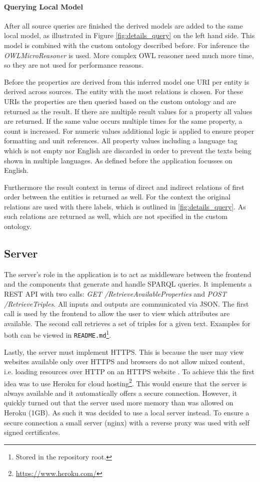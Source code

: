 \paragraph{Querying Local Model}
After all source queries are finished the derived models are added to the same local model, as illustrated in Figure \ref{fig:details_query} on the left hand side. This model is combined with the custom ontology described before. For inference the \textit{OWLMicroReasoner} is used. More complex OWL reasoner need much more time, so they are not used for performance reasons. 

Before the properties are derived from this inferred model one URI per entity is derived across sources. The entity with the most relations is chosen. 
For these URIs the properties are then queried based on the custom ontology and are returned as the result. If there are multiple result values for a property all values are returned. If the same value occurs multiple times for the same property, a count is increased. For numeric values additional logic is applied to ensure proper formatting and unit references. All property values including a language tag which is not empty nor English are discarded in order to prevent the texts being shown in multiple languages. As defined before the application focusses on English. 

Furthermore the result context in terms of direct and indirect relations of first order between the entities is returned as well. For the context the original relations are used with there labels, which is outlined in \ref{fig:details_query}. As such relations are returned as well, which are not specified in the custom ontology. 

\subsection{Server} 
\label{sec:server}
The server's role in the application is to act as middleware between the frontend and the components that generate and handle SPARQL queries. It implements a REST API with two calls: \textit{GET /RetrieveAvailableProperties} and \textit{POST /RetrieveTriples}. All inputs and outputs are communicated via JSON. The first call is used by the frontend to allow the user to view which attributes are available. The second call retrieves a set of triples for a given text. Examples for both can be viewed in \texttt{README.md}\footnote{Stored in the repository root.}. 

Lastly, the server must implement HTTPS. This is because the user may view websites available only over HTTPS and browsers do not allow mixed content, i.e. loading resources over HTTP on an HTTPS website \cite{ChromeMixedContent}. To achieve this the first idea was to use Heroku for cloud hosting\footnote{\url{https://www.heroku.com/}}. This would ensure that the server is always available and it automatically offers a secure connection. However, it quickly turned out that the server used more memory than was allowed on Heroku (1GB). As such it was decided to use a local server instead. To ensure a secure connection a small server (nginx) with a reverse proxy was used with self signed certificates\cite{nginxReverseProxy}. 




